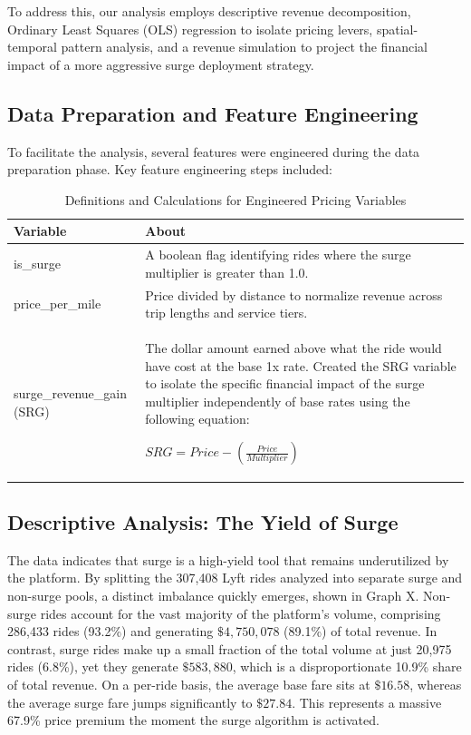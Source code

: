 \documentclass[11pt, letterpaper]{article}
\begin{document}
To address this, our analysis employs descriptive revenue decomposition, Ordinary Least Squares (OLS) regression to isolate pricing levers, spatial-temporal pattern analysis, and a revenue simulation to project the financial impact of a more aggressive surge deployment strategy.


\subsection{Data Preparation and Feature Engineering}

To facilitate the analysis, several features were engineered during the data preparation phase. Key feature engineering steps included:

\begin{table}[H]
  \centering
  \caption{Definitions and Calculations for Engineered Pricing Variables}
  \label{tab:descriptive}
  \begin{tabularx}{\textwidth}{l X}
    \toprule
    Variable & About \\
    \midrule
    is\_surge & A boolean flag identifying rides where the surge multiplier is greater than 1.0. \\
    price\_per\_mile & Price divided by distance to normalize revenue across trip lengths and service tiers. \\
    surge\_revenue\_gain (SRG) & The dollar amount earned above what the ride would have cost at the base 1x rate. Created the SRG variable to isolate the specific financial impact of the surge multiplier independently of base rates using the following equation: \begin{center}$SRG = Price - \left(\frac{Price} {Multiplier}\right)$ \end{center}\\
    \bottomrule
  \end{tabularx}
\end{table}


\subsection{Descriptive Analysis: The Yield of Surge}

The data indicates that surge is a high-yield tool that remains underutilized by the platform. By splitting the 307,408 Lyft rides analyzed into separate surge and non-surge pools, a distinct imbalance quickly emerges, shown in Graph X. Non-surge rides account for the vast majority of the platform's volume, comprising 286,433 rides (93.2\%) and generating $\$4,750,078$ (89.1\%) of total revenue. In contrast, surge rides make up a small fraction of the total volume at just 20,975 rides (6.8\%), yet they generate $\$583,880$, which is a disproportionate 10.9\% share of total revenue. On a per-ride basis, the average base fare sits at $\$16.58$, whereas the average surge fare jumps significantly to $\$27.84$. This represents a massive 67.9\% price premium the moment the surge algorithm is activated.
\end{document}

